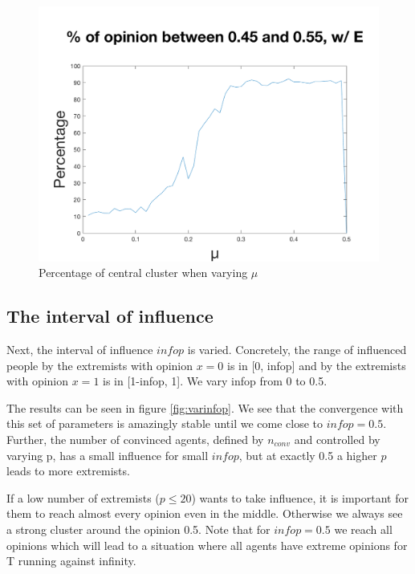 \documentclass[11pt]{article}
\begin{document}
\begin{figure}[!htb]
\center
  \includegraphics[width=0.7\linewidth]{gen_plot_intervall_2017121721201994207e+01.png}
  \caption{Percentage of central cluster when varying $\mu$}
  \label{fig:uwitextremists}
\end{figure}

\subsection{The interval of influence}
Next, the interval of influence $infop$ is varied. Concretely, the range of influenced people by the extremists with opinion $x=0$ is in [0, infop] and by the extremists with opinion $x=1$ is in [1-infop, 1]. We vary infop from 0 to 0.5. 

The results can be seen in figure \ref{fig:varinfop}. We see that the convergence with this set of parameters is amazingly stable until we come close to $infop = 0.5$. Further, the number of convinced agents, defined by $n_{conv}$ and controlled by varying p, has a small influence for small $infop$, but at exactly 0.5 a higher $p$ leads to more extremists.

If a low number of extremists ($p \leq 20$) wants to take influence, it is important for them to reach almost every opinion even in the middle. Otherwise we always see a strong cluster around the opinion 0.5. Note that for $infop = 0.5$ we reach all opinions which will lead to a situation where all agents have extreme opinions for T running against infinity.
\end{document}
